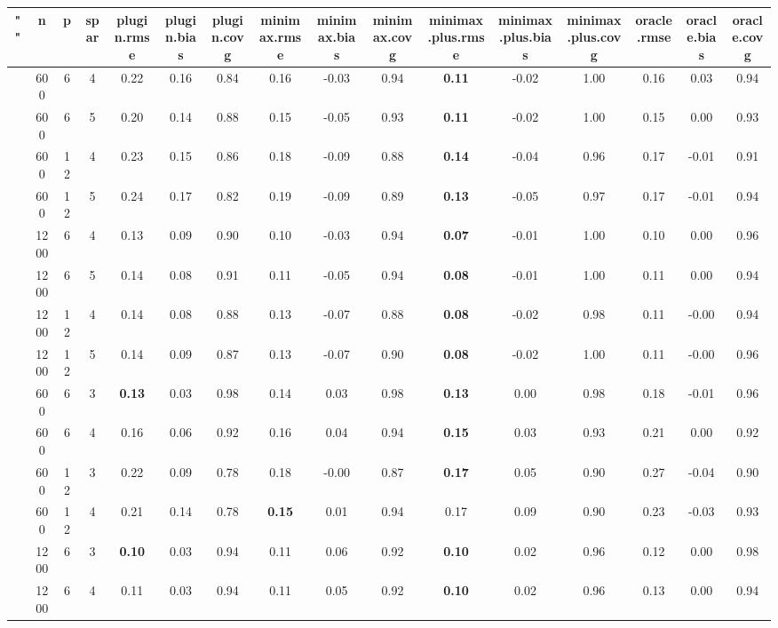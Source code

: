 \begin{table}[ht]
\centering
\begin{tabular}{||c|ccc||ccc|ccc|ccc|ccc}
  \hline
\hline
"" & n & p & spar & plugin.rmse & plugin.bias & plugin.covg & minimax.rmse & minimax.bias & minimax.covg & minimax.plus.rmse & minimax.plus.bias & minimax.plus.covg & oracle.rmse & oracle.bias & oracle.covg \\ 
  \hline
 & 600 & 6 & 4 & 0.22 & 0.16 & 0.84 & 0.16 & -0.03 & 0.94 & \bf 0.11 & -0.02 & 1.00 & 0.16 & 0.03 & 0.94 \\ 
   & 600 & 6 & 5 & 0.20 & 0.14 & 0.88 & 0.15 & -0.05 & 0.93 & \bf 0.11 & -0.02 & 1.00 & 0.15 & 0.00 & 0.93 \\ 
   & 600 & 12 & 4 & 0.23 & 0.15 & 0.86 & 0.18 & -0.09 & 0.88 & \bf 0.14 & -0.04 & 0.96 & 0.17 & -0.01 & 0.91 \\ 
   & 600 & 12 & 5 & 0.24 & 0.17 & 0.82 & 0.19 & -0.09 & 0.89 & \bf 0.13 & -0.05 & 0.97 & 0.17 & -0.01 & 0.94 \\ 
   & 1200 & 6 & 4 & 0.13 & 0.09 & 0.90 & 0.10 & -0.03 & 0.94 & \bf 0.07 & -0.01 & 1.00 & 0.10 & 0.00 & 0.96 \\ 
   & 1200 & 6 & 5 & 0.14 & 0.08 & 0.91 & 0.11 & -0.05 & 0.94 & \bf 0.08 & -0.01 & 1.00 & 0.11 & 0.00 & 0.94 \\ 
   & 1200 & 12 & 4 & 0.14 & 0.08 & 0.88 & 0.13 & -0.07 & 0.88 & \bf 0.08 & -0.02 & 0.98 & 0.11 & -0.00 & 0.94 \\ 
   & 1200 & 12 & 5 & 0.14 & 0.09 & 0.87 & 0.13 & -0.07 & 0.90 & \bf 0.08 & -0.02 & 1.00 & 0.11 & -0.00 & 0.96 \\ 
   \hline
 & 600 & 6 & 3 & \bf 0.13 & 0.03 & 0.98 & 0.14 & 0.03 & 0.98 & \bf 0.13 & 0.00 & 0.98 & 0.18 & -0.01 & 0.96 \\ 
   & 600 & 6 & 4 & 0.16 & 0.06 & 0.92 & 0.16 & 0.04 & 0.94 & \bf 0.15 & 0.03 & 0.93 & 0.21 & 0.00 & 0.92 \\ 
   & 600 & 12 & 3 & 0.22 & 0.09 & 0.78 & 0.18 & -0.00 & 0.87 & \bf 0.17 & 0.05 & 0.90 & 0.27 & -0.04 & 0.90 \\ 
   & 600 & 12 & 4 & 0.21 & 0.14 & 0.78 & \bf 0.15 & 0.01 & 0.94 & 0.17 & 0.09 & 0.90 & 0.23 & -0.03 & 0.93 \\ 
   & 1200 & 6 & 3 & \bf 0.10 & 0.03 & 0.94 & 0.11 & 0.06 & 0.92 & \bf 0.10 & 0.02 & 0.96 & 0.12 & 0.00 & 0.98 \\ 
   & 1200 & 6 & 4 & 0.11 & 0.03 & 0.94 & 0.11 & 0.05 & 0.92 & \bf 0.10 & 0.02 & 0.96 & 0.13 & 0.00 & 0.94 \\ 

\end{tabular}
\end{table}
